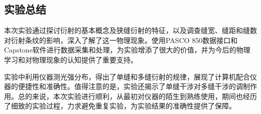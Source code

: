 \documentclass[a4paper]{../phyreport}
\begin{document}
\subsection{实验总结}

本次实验通过探讨衍射的基本概念及狭缝衍射的特征，以及调查缝宽、缝距和缝数对衍射条纹的影响，深入了解了这一物理现象。使用PASCO 850数据接口和Capstone软件进行数据采集和处理，为实验增添了很大的价值，并为今后的物理学习和对物理现象的认知提供了重要支持。

实验中利用仪器测光强分布，得出了单缝和多缝衍射的规律，展现了计算机配合仪器的便捷性和准确性。值得注意的是，实验还揭示了单缝干涉对多缝干涉的调制作用。总的来说，本次实验进行顺利，从最初对仪器的陌生到熟练使用，期间也经历了细致的实验过程，力求避免重复实验，为实验结果的准确性提供了保障。


\endBox
\end{document}
